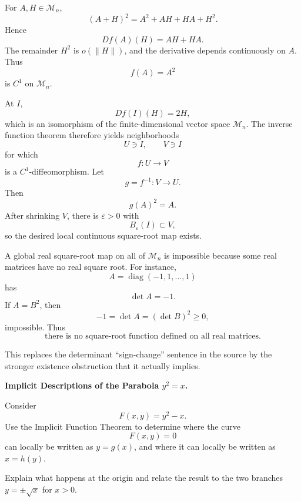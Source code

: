 \begin{solution}
For \(A,H\in\mathcal M_n\),
\[
(A+H)^2
=
A^2+AH+HA+H^2.
\]
Hence
\[
\boxed{
Df(A)(H)=AH+HA.
}
\]
The remainder \(H^2\) is \(o(\|H\|)\), and the derivative depends continuously on \(A\).
Thus
\[
f(A)=A^2
\]
is \(C^1\) on \(\mathcal M_n\).

At \(I\),
\[
Df(I)(H)=2H,
\]
which is an isomorphism of the finite-dimensional vector space \(\mathcal M_n\). The inverse
function theorem therefore yields neighborhoods
\[
U\ni I,\qquad V\ni I
\]
for which
\[
f:U\to V
\]
is a \(C^1\)-diffeomorphism. Let
\[
g=f^{-1}:V\to U.
\]
Then
\[
g(A)^2=A.
\]
After shrinking \(V\), there is \(\varepsilon>0\) with
\[
B_\varepsilon(I)\subset V,
\]
so the desired local continuous square-root map exists.

A global real square-root map on all of \(\mathcal M_n\) is impossible because some real
matrices have no real square root. For instance,
\[
A=\operatorname{diag}(-1,1,\ldots,1)
\]
has
\[
\det A=-1.
\]
If \(A=B^2\), then
\[
-1=\det A=(\det B)^2\ge0,
\]
impossible. Thus
\[
\boxed{\text{there is no square-root function defined on all real matrices}.}
\]

This replaces the determinant ``sign-change'' sentence in the source by the stronger
existence obstruction that it actually implies.
\end{solution}


\begin{problem}[CP-II-0135]
\label{prob:cp-ii-0135}
\textbf{Implicit Descriptions of the Parabola \(y^2=x\).}

\hspace*{1.5em}Consider
\[
F(x,y)=y^2-x.
\]
Use the Implicit Function Theorem to determine where the curve
\[
F(x,y)=0
\]
can locally be written as \(y=g(x)\), and where it can locally be written as
\(x=h(y)\).

Explain what happens at the origin and relate the result to the two branches
\(y=\pm\sqrt{x}\) for \(x>0\).
\end{problem}

